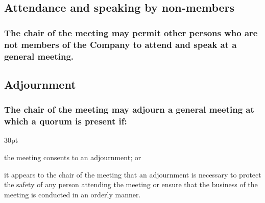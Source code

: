 \documentclass[12pt]{article}
\newcommand*{\fancyref}[1]{\hyperref[{#1}]{\autoref*{#1} (\nameref*{#1})}}
\def\clauseindent{30pt}
\newenvironment{subindentpara}{\begin{adjustwidth}{\clauseindent}{}\begin{hanginglist}}{\end{hanginglist}\end{adjustwidth}}
\begin{document}

\subsection{Attendance and speaking by non-members}
\subsubsection[Meeting chair may authorise any person to speak at a meeting]{The chair of the meeting may permit other persons who are not members of the Company to attend and speak at a general meeting.}

\subsection{Adjournment}
\subsubsection[Adjournment of general meetings with quorum]{The chair of the meeting may adjourn a general meeting at which a quorum is present if:}
\begin{subindentpara}
    \item the meeting consents to an adjournment; or
    \item it appears to the chair of the meeting that an adjournment is necessary to protect the safety of any person attending the meeting or ensure that the business of the meeting is conducted in an orderly manner.
\end{subindentpara}
\end{document}
